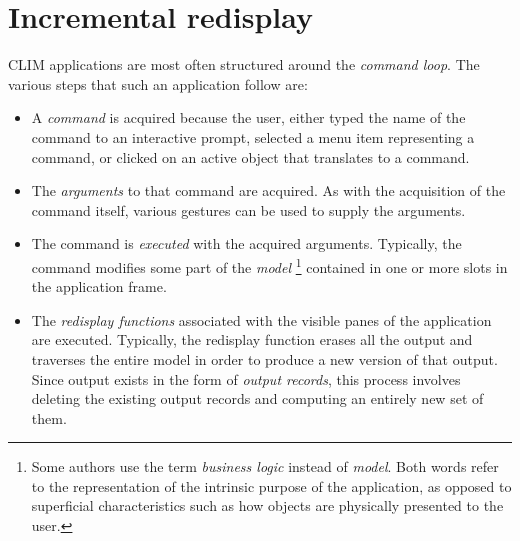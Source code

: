\chapter{Incremental redisplay}

CLIM applications are most often structured around the \emph{command
  loop}.  The various steps that such an application follow are:

\begin{itemize}
\item A \emph{command} is acquired because the user, either typed the
  name of the command to an interactive prompt, selected a menu item
  representing a command, or clicked on an active object that
  translates to a command.
\item The \emph{arguments} to that command are acquired.  As with the
  acquisition of the command itself, various gestures can be used to
  supply the arguments.
\item The command is \emph{executed} with the acquired arguments.
  Typically, the command modifies some part of the \emph{model}%
\footnote{Some authors use the term \emph{business logic} instead of
  \emph{model}.  Both words refer to the representation of the
  intrinsic purpose of the application, as opposed to superficial
  characteristics such as how objects are physically presented to the
  user.} contained in one or more slots in the application frame.
\item The \emph{redisplay functions} associated with the visible panes
  of the application are executed.  Typically, the redisplay function
  erases all the output and traverses the entire model in order to
  produce a new version of that output.  Since output exists in the
  form of \emph{output records}, this process involves deleting the
  existing output records and computing an entirely new set of them.
\end{itemize}
